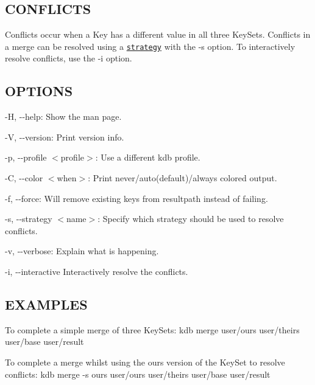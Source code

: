 \subsection*{C\+O\+N\+F\+L\+I\+C\+TS}

Conflicts occur when a Key has a different value in all three Key\+Sets. Conflicts in a merge can be resolved using a \href{#STRATEGIES}{\tt strategy} with the {\ttfamily -\/s} option. To interactively resolve conflicts, use the {\ttfamily -\/i} option.

\subsection*{O\+P\+T\+I\+O\+NS}


\begin{DoxyItemize}
\item {\ttfamily -\/H}, {\ttfamily -\/-\/help}\+: Show the man page.
\item {\ttfamily -\/V}, {\ttfamily -\/-\/version}\+: Print version info.
\item {\ttfamily -\/p}, {\ttfamily -\/-\/profile $<$profile$>$}\+: Use a different kdb profile.
\item {\ttfamily -\/C}, {\ttfamily -\/-\/color $<$when$>$}\+: Print never/auto(default)/always colored output.
\item {\ttfamily -\/f}, {\ttfamily -\/-\/force}\+: Will remove existing keys from {\ttfamily resultpath} instead of failing.
\item {\ttfamily -\/s}, {\ttfamily -\/-\/strategy $<$name$>$}\+: Specify which strategy should be used to resolve conflicts.
\item {\ttfamily -\/v}, {\ttfamily -\/-\/verbose}\+: Explain what is happening.
\item {\ttfamily -\/i}, {\ttfamily -\/-\/interactive} Interactively resolve the conflicts.
\end{DoxyItemize}

\subsection*{E\+X\+A\+M\+P\+L\+ES}

To complete a simple merge of three Key\+Sets\+: {\ttfamily kdb merge user/ours user/theirs user/base user/result}

To complete a merge whilst using the {\ttfamily ours} version of the Key\+Set to resolve conflicts\+: {\ttfamily kdb merge -\/s ours user/ours user/theirs user/base user/result}

